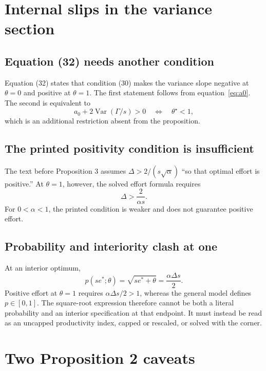 \documentclass[11pt]{article}
\newcommand{\Var}{\operatorname{Var}}
\begin{document}
\section{Internal slips in the variance section}

\subsection{Equation (32) needs another condition}

Equation (32) states that condition (30) makes the variance slope negative at
$\theta=0$ and positive at $\theta=1$. The first statement follows from
equation~\eqref{eq:a0}. The second is equivalent to
\begin{equation}
  a_0+2\Var(\Gamma/s)>0
  \quad\Longleftrightarrow\quad
  \theta^\star<1,
\end{equation}
which is an additional restriction absent from the proposition.

\subsection{The printed positivity condition is insufficient}

The text before Proposition 3 assumes
$\Delta>2/(s\sqrt{\alpha})$ ``so that optimal effort is positive.'' At
$\theta=1$, however, the solved effort formula requires
\begin{equation}
  \Delta>\frac{2}{\alpha s}.
\end{equation}
For $0<\alpha<1$, the printed condition is weaker and does not guarantee
positive effort.

\subsection{Probability and interiority clash at one}

At an interior optimum,
\begin{equation}
  p(se^*;\theta)
  =\sqrt{se^*+\theta}
  =\frac{\alpha\Delta s}{2}.
\end{equation}
Positive effort at $\theta=1$ requires $\alpha\Delta s/2>1$, whereas the
general model defines $p\in[0,1]$. The square-root expression therefore cannot
be both a literal probability and an interior specification at that endpoint.
It must instead be read as an uncapped productivity index, capped or rescaled,
or solved with the corner.

\section{Two Proposition 2 caveats}
\end{document}

